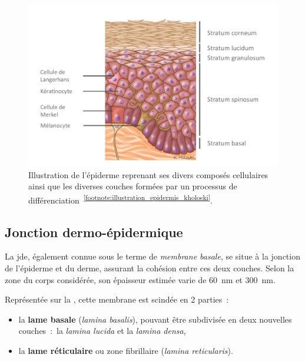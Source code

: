  \begin{figure}[H]
    \centering
    \includegraphics[width=0.9\linewidth]{contents/chapter_1/resources/illustration_epidermis_kholoski.pdf}
    \caption{Illustration de l'épiderme reprenant ses divers composés cellulaires ainsi que les diverses couches formées par un processus de différenciation~\textsuperscript{\ref{footnote:illustration_epidermis_kholoski}}.}
    \label{fig:illustration_epidermis_kholoski}
\end{figure}\par

\addtocounter{footnote}{1}
\clearpage

\subsection{Jonction dermo-épidermique}
La \gls{jde}, également connue sous le terme de \textit{membrane basale}, se situe à la jonction de l’épiderme et du derme, assurant la cohésion entre ces deux couches. Selon la zone du corps considérée, son épaisseur estimée varie de \SI{60}{\nano\metre} et \SI{300}{\nano\metre}.\par

Représentée sur la , cette membrane est scindée en 2 parties~:
\begin{itemize}
    \item la \textbf{lame basale} (\textit{lamina basalis}), pouvant être subdivisée en deux nouvelles couches~:~la \textit{lamina lucida} et la \textit{lamina densa},
    \item la \textbf{lame réticulaire} ou zone fibrillaire (\textit{lamina reticularis}).
\end{itemize}\par

